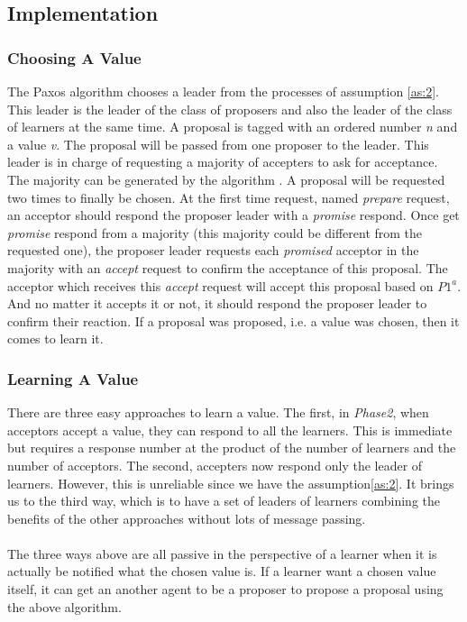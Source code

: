 \documentclass[12pt, a4paper]{article}
\begin{document}
\subsection{Implementation}
\subsubsection{Choosing A Value}\label{Choosing}
The Paxos algorithm \cite{lamport1998part} chooses a leader 
from the processes of assumption \ref{as:2}. 
This leader is the leader of the class of proposers and 
also the leader of the class of learners at the same time. 
A proposal is tagged with an ordered number \textit{n} and a value \textit{v}.
The proposal will be passed from one proposer to the leader. 
This leader is in charge of requesting a majority of accepters to ask for 
acceptance.
The majority can be generated by the algorithm \cite{keidar2001cost}.
A proposal will be requested two times to finally be chosen.
At the first time request, named \textit{prepare} request, 
an acceptor should respond the proposer leader with a \textit{promise} respond.
Once get \textit{promise} respond from a majority 
(this majority could be different from the requested one),
the proposer leader requests each \textit{promised} acceptor 
in the majority with an \textit{accept} request 
to confirm the acceptance of this proposal.
The acceptor which receives this \textit{accept} request 
will accept this proposal based on $P1^a$. 
And no matter it accepts it or not, it should respond the proposer leader to
confirm their reaction.
If a proposal was proposed, i.e. a value was chosen, 
then it comes to learn it.

\subsubsection{Learning A Value}
There are three easy approaches to learn a value.
The first, in \textit{Phase2}, when acceptors accept a value, 
they can respond to all the learners. 
This is immediate but requires a response number at
the product of the number of learners and the number of acceptors.
The second, accepters now respond only the leader of learners. 
However, this is unreliable since we have the assumption\ref{as:2}.
It brings us to the third way, which is to have a set of leaders of learners
combining the benefits of the other approaches without lots of message passing.
\paragraph{}
The three ways above are all passive in the perspective of a learner when
it is actually be notified what the chosen value is.
If a learner want a chosen value itself, 
it can get an another agent to be  a proposer 
to propose a proposal using the above algorithm. 
\end{document}
